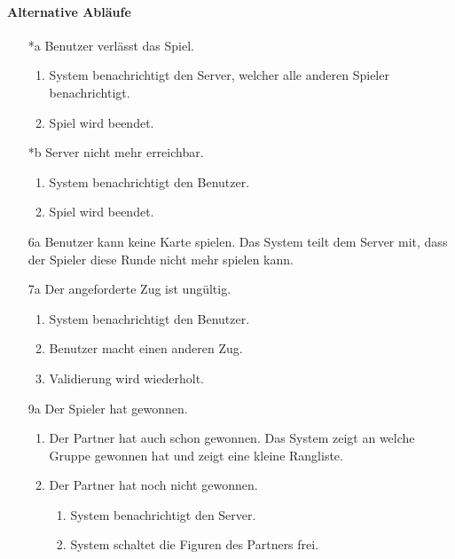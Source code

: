 \documentclass[a4paper,12pt,halfparskip,DIV14]{scrartcl}
\begin{document}
\paragraph{Alternative Abläufe}
\begin{enumerate}
	\item[*a] Benutzer verlässt das Spiel.
	\begin{enumerate}
		\item System benachrichtigt den Server, welcher alle anderen Spieler benachrichtigt.
		\item Spiel wird beendet.
	\end{enumerate}
	
	\item[*b] Server nicht mehr erreichbar.
	\begin{enumerate}
		\item System benachrichtigt den Benutzer.
		\item Spiel wird beendet.
	\end{enumerate}
	
	\item[6a] Benutzer kann keine Karte spielen.\newline
	Das System teilt dem Server mit, dass der Spieler diese Runde nicht mehr spielen kann.
	
	\item[7a] Der angeforderte Zug ist ungültig.
	\begin{enumerate}
		\item System benachrichtigt den Benutzer.
		\item Benutzer macht einen anderen Zug.
		\item Validierung wird wiederholt.
	\end{enumerate}
	
	\item[9a] Der Spieler hat gewonnen.
	\begin{enumerate}
		\item Der Partner hat auch schon gewonnen.\newline
		Das System zeigt an welche Gruppe gewonnen hat und zeigt eine kleine Rangliste.
		\item Der Partner hat noch nicht gewonnen.
		\begin{enumerate}
			\item System benachrichtigt den Server.
			\item System schaltet die Figuren des Partners frei.
		\end{enumerate}
	\end{enumerate}
\end{enumerate}
\end{document}
